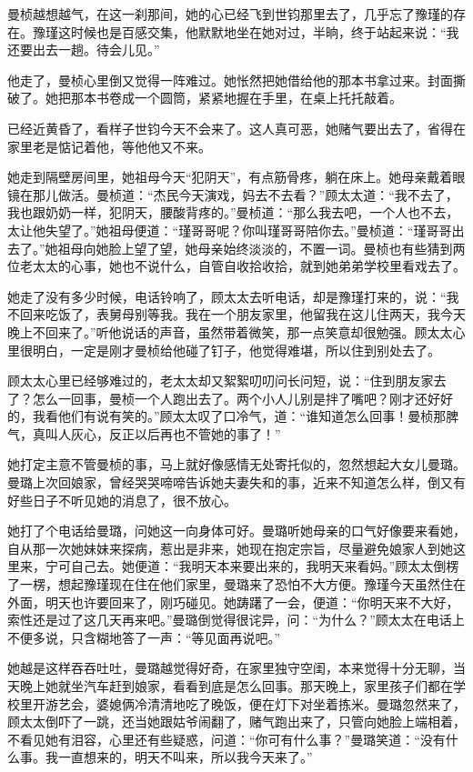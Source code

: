 \par 曼桢越想越气，在这一刹那间，她的心已经飞到世钧那里去了，几乎忘了豫瑾的存在。豫瑾这时候也是百感交集，他默默地坐在她对过，半晌，终于站起来说：“我还要出去一趟。待会儿见。”
\par 他走了，曼桢心里倒又觉得一阵难过。她怅然把她借给他的那本书拿过来。封面撕破了。她把那本书卷成一个圆筒，紧紧地握在手里，在桌上托托敲着。
\par 已经近黄昏了，看样子世钧今天不会来了。这人真可恶，她赌气要出去了，省得在家里老是惦记着他，等他他又不来。
\par 她走到隔壁房间里，她祖母今天“犯阴天”，有点筋骨疼，躺在床上。她母亲戴着眼镜在那儿做活。曼桢道：“杰民今天演戏，妈去不去看？”顾太太道：“我不去了，我也跟奶奶一样，犯阴天，腰酸背疼的。”曼桢道：“那么我去吧，一个人也不去，太让他失望了。”她祖母便道：“瑾哥哥呢？你叫瑾哥哥陪你去。”曼桢道：“瑾哥哥出去了。”她祖母向她脸上望了望，她母亲始终淡淡的，不置一词。曼桢也有些猜到两位老太太的心事，她也不说什么，自管自收拾收拾，就到她弟弟学校里看戏去了。
\par 她走了没有多少时候，电话铃响了，顾太太去听电话，却是豫瑾打来的，说：“我不回来吃饭了，表舅母别等我。我在一个朋友家里，他留我在这儿住两天，我今天晚上不回来了。”听他说话的声音，虽然带着微笑，那一点笑意却很勉强。顾太太心里很明白，一定是刚才曼桢给他碰了钉子，他觉得难堪，所以住到别处去了。
\par 顾太太心里已经够难过的，老太太却又絮絮叨叨问长问短，说：“住到朋友家去了？怎么一回事，曼桢一个人跑出去了。两个小人儿别是拌了嘴吧？刚才还好好的，我看他们有说有笑的。”顾太太叹了口冷气，道：“谁知道怎么回事！曼桢那脾气，真叫人灰心，反正以后再也不管她的事了！”
\par 她打定主意不管曼桢的事，马上就好像感情无处寄托似的，忽然想起大女儿曼璐。曼璐上次回娘家，曾经哭哭啼啼告诉她夫妻失和的事，近来不知道怎么样，倒又有好些日子不听见她的消息了，很不放心。
\par 她打了个电话给曼璐，问她这一向身体可好。曼璐听她母亲的口气好像要来看她，自从那一次她妹妹来探病，惹出是非来，她现在抱定宗旨，尽量避免娘家人到她这里来，宁可自己去。她便道：“我明天本来要出来的，我明天来看妈。”顾太太倒楞了一楞，想起豫瑾现在住在他们家里，曼璐来了恐怕不大方便。豫瑾今天虽然住在外面，明天也许要回来了，刚巧碰见。她踌躇了一会，便道：“你明天来不大好，索性还是过了这几天再来吧。”曼璐倒觉得很诧异，问：“为什么？”顾太太在电话上不便多说，只含糊地答了一声：“等见面再说吧。”
\par 她越是这样吞吞吐吐，曼璐越觉得好奇，在家里独守空闺，本来觉得十分无聊，当天晚上她就坐汽车赶到娘家，看看到底是怎么回事。那天晚上，家里孩子们都在学校里开游艺会，婆媳俩冷清清地吃了晚饭，便在灯下对坐着拣米。曼璐忽然来了，顾太太倒吓了一跳，还当她跟姑爷闹翻了，赌气跑出来了，只管向她脸上端相着，不看见她有泪容，心里还有些疑惑，问道：“你可有什么事？”曼璐笑道：“没有什么事。我一直想来的，明天不叫来，所以我今天来了。”
